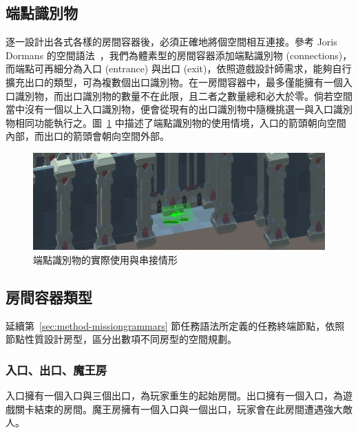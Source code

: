 \subsection{端點識別物}
\label{ssec:method-spacepieces-connections}

逐一設計出各式各樣的房間容器後，必須正確地將個空間相互連接。參考 Joris Dormans 的空間語法~\cite{dormans2012engineering}，我們為體素型的房間容器添加端點識別物 (connections)，而端點可再細分為入口 (entrance) 與出口 (exit)，依照遊戲設計師需求，能夠自行擴充出口的類型，可為複數個出口識別物。在一房間容器中，最多僅能擁有一個入口識別物，而出口識別物的數量不在此限，且二者之數量總和必大於零。倘若空間當中沒有一個以上入口識別物，便會從現有的出口識別物中隨機挑選一與入口識別物相同功能執行之。圖~\ref{fig:connections-in-volume} 中描述了端點識別物的使用情境，入口的箭頭朝向空間內部，而出口的箭頭會朝向空間外部。

\begin{figure}[ht]
  \begin{center}
    \includegraphics[width=1.0\textwidth]{figures/connections-in-volume.png}
    \caption{端點識別物的實際使用與串接情形} 
    \label{fig:connections-in-volume}
  \end{center}
\end{figure}

\subsection{房間容器類型}
\label{ssec:method-spacepieces-types}

延續第~\ref{sec:method-missiongrammars} 節任務語法所定義的任務終端節點，依照節點性質設計房型，區分出數項不同房型的空間規劃。

\subsubsection{入口、出口、魔王房}
\label{sssec:method-spacepieces-types-mainpath-i}

入口擁有一個入口與三個出口，為玩家重生的起始房間。出口擁有一個入口，為遊戲關卡結束的房間。魔王房擁有一個入口與一個出口，玩家會在此房間遭遇強大敵人。

